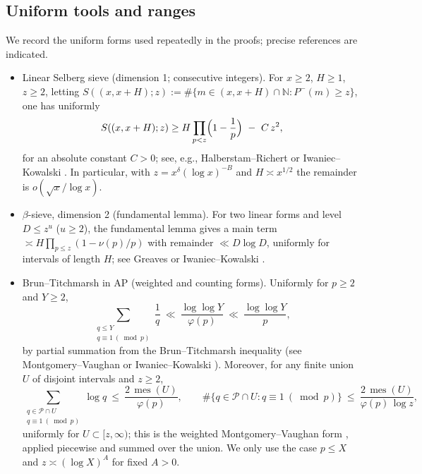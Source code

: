 \documentclass[12pt]{article}
\theoremstyle{remark}
\begin{document}
\subsection*{Uniform tools and ranges}
We record the uniform forms used repeatedly in the proofs; precise references are indicated.
\begin{itemize}
  \item Linear Selberg sieve (dimension 1; consecutive integers). For $x\ge2$, $H\ge1$, $z\ge2$, letting $S((x,x+H);z):=\#\{m\in(x,x+H)\cap\mathbb N: P^-(m)\ge z\}$, one has uniformly
  \[
    S((x,x+H);z)\ge H\prod_{p<z}\Bigl(1-\frac1p\Bigr)\ -\ C\,z^2,
  \]
  for an absolute constant $C>0$; see, e.g., Halberstam--Richert \cite[Th.~2.3, Th.~2.4]{HalRich1974} or Iwaniec--Kowalski \cite[\S11.1]{IK2004}. In particular, with $z=x^{\delta}(\log x)^{-B}$ and $H\asymp x^{1/2}$ the remainder is $o(\sqrt x/\log x)$.
  \item $\beta$-sieve, dimension 2 (fundamental lemma). For two linear forms and level $D\le z^u$ ($u\ge2$), the fundamental lemma gives a main term $\asymp H\prod_{p\le z}(1-\nu(p)/p)$ with remainder $\ll D\log D$, uniformly for intervals of length $H$; see Greaves \cite[Th.~5.7]{Greaves2001} or Iwaniec--Kowalski \cite[Th.~11.13]{IK2004}.
  \item Brun--Titchmarsh in AP (weighted and counting forms). Uniformly for $p\ge2$ and $Y\ge2$,
  \[
    \sum_{\substack{q\le Y\\ q\equiv1\ (\bmod p)}}\frac1q\ \ll\ \frac{\log\log Y}{\varphi(p)}\ \ll\ \frac{\log\log Y}{p},
  \]
  by partial summation from the Brun--Titchmarsh inequality (see Montgomery--Vaughan \cite[Th.~6.6]{MV2007} or Iwaniec--Kowalski \cite[Th.~18.11]{IK2004}). Moreover, for any finite union $U$ of disjoint intervals and $z\ge2$,
  \[
    \sum_{\substack{q\in\mathcal P\cap U\\ q\equiv1\ (\bmod p)}}\log q\ \le\ \frac{2\,\operatorname{mes}(U)}{\varphi(p)},\qquad
    \#\{q\in\mathcal P\cap U: q\equiv1\ (\bmod p)\}\ \le\ \frac{2\,\operatorname{mes}(U)}{\varphi(p)\,\log z},
  \]
  uniformly for $U\subset[z,\infty)$; this is the weighted Montgomery--Vaughan form \cite[Th.~6.7]{MV2007}, applied piecewise and summed over the union. We only use the case $p\le X$ and $z\asymp (\log X)^A$ for fixed $A>0$.
\end{itemize}
\end{document}
